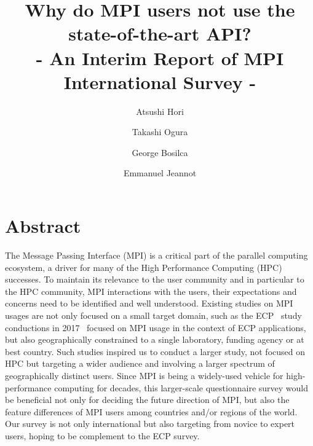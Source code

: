 \documentclass[sigconf,nonacm]{acmart}
\begin{document}
\title{Why do MPI users not use the state-of-the-art API?\\
- An Interim Report of MPI International Survey -}


\author{Atsushi Hori}
\author{Takashi Ogura}

\author{George Bosilca}

\author{Emmanuel Jeannot}

\maketitle

\section{Abstract}

The Message Passing Interface (MPI) is a critical part of the parallel computing
ecosystem, a driver for many of the High Performance Computing (HPC) successes.
To maintain its relevance to the user community and in particular to the HPC
community, MPI interactions with the users, their expectations and concerns need
to be identified and well understood.
%
Existing studies on MPI usages are not only focused on a small target domain,
such as the ECP~\cite{ECP} study conductions in 2017~\cite{osti_1462877} focused
on MPI usage in the context of ECP applications, but also geographically
constrained to a single laboratory, funding agency or at best country.
%
Such studies inspired us to conduct a larger study, not focused on HPC but
targeting a wider audience and involving a larger spectrum of geographically
distinct users. Since MPI is being a widely-used vehicle for high-performance
computing for decades, this larger-scale questionnaire survey would be
beneficial not only for deciding the future direction of MPI, but also the
feature differences of MPI users among countries and/or regions of the world.
Our survey is not only international but also targeting from novice to expert
users, hoping to be complement to the ECP survey.
\end{document}

